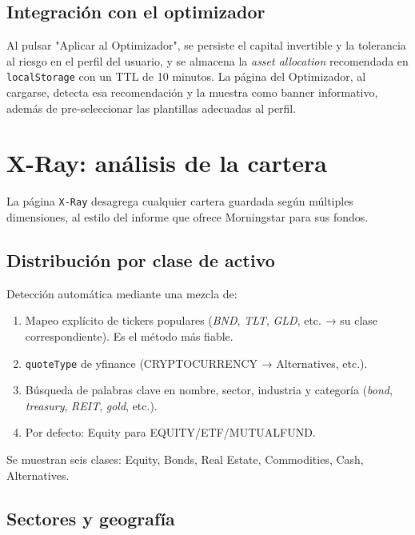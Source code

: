 \documentclass[11pt,a4paper]{article}
\begin{document}
\subsection{Integración con el optimizador}

Al pulsar "Aplicar al Optimizador", se persiste el capital invertible y la tolerancia al riesgo en el perfil del usuario, y se almacena la \textit{asset allocation} recomendada en \texttt{localStorage} con un TTL de 10 minutos. La página del Optimizador, al cargarse, detecta esa recomendación y la muestra como banner informativo, además de pre-seleccionar las plantillas adecuadas al perfil.

\section{X-Ray: análisis de la cartera}

La página \texttt{X-Ray} desagrega cualquier cartera guardada según múltiples dimensiones, al estilo del informe que ofrece Morningstar para sus fondos.

\subsection{Distribución por clase de activo}

Detección automática mediante una mezcla de:
\begin{enumerate}
  \item Mapeo explícito de tickers populares (\textit{BND}, \textit{TLT}, \textit{GLD}, etc. → su clase correspondiente). Es el método más fiable.
  \item \texttt{quoteType} de yfinance (CRYPTOCURRENCY → Alternatives, etc.).
  \item Búsqueda de palabras clave en nombre, sector, industria y categoría (\textit{bond}, \textit{treasury}, \textit{REIT}, \textit{gold}, etc.).
  \item Por defecto: Equity para EQUITY/ETF/MUTUALFUND.
\end{enumerate}

Se muestran seis clases: Equity, Bonds, Real Estate, Commodities, Cash, Alternatives.

\subsection{Sectores y geografía}
\end{document}
